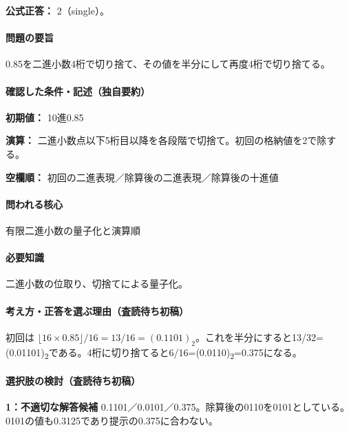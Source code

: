 \textbf{公式正答：} 2（single）。

\paragraph{問題の要旨} 0.85を二進小数4桁で切り捨て、その値を半分にして再度4桁で切り捨てる。

\paragraph{確認した条件・記述（独自要約）}\mbox{}\par

\noindent\textbf{初期値：} 10進0.85\par

\noindent\textbf{演算：} 二進小数点以下5桁目以降を各段階で切捨て。初回の格納値を2で除する。\par

\noindent\textbf{空欄順：} 初回の二進表現／除算後の二進表現／除算後の十進値\par

\paragraph{問われる核心} 有限二進小数の量子化と演算順

\paragraph{必要知識} 二進小数の位取り、切捨てによる量子化。

\paragraph{考え方・正答を選ぶ理由（査読待ち初稿）} 初回は \(\lfloor16\times0.85\rfloor/16=13/16=(0.1101)_2\)。これを半分にすると13/32=\allowbreak{}(0.01101)\textsubscript{2}である。4桁に切り捨てると6/16=\allowbreak{}(0.0110)\textsubscript{2}=0.375になる。

\paragraph{選択肢の検討（査読待ち初稿）}\mbox{}\par

\noindent\textbf{1：不適切な解答候補} 0.1101／0.0101／0.375。除算後の0110を0101としている。0101の値も0.3125であり提示の0.375に合わない。\par

